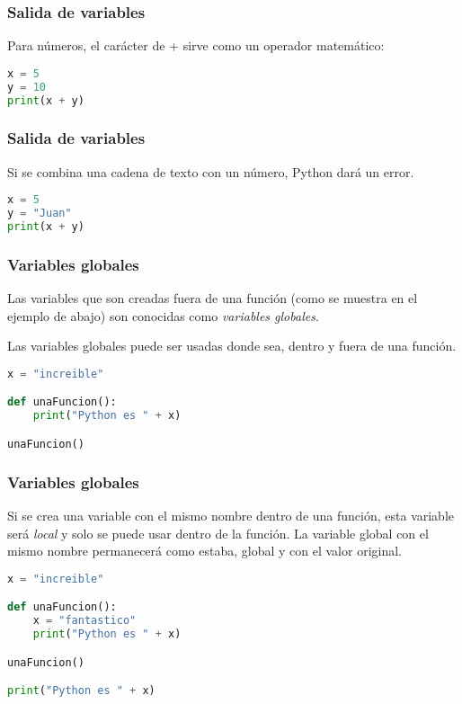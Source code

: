 \begin{frame}[fragile]
  \frametitle{Salida de variables}

  Para números, el carácter de \textcolor{codeKeyword}{+} sirve como un
  operador matemático:

  \vspace{\baselineskip}
  \begin{lstlisting}[language=Python]
x = 5
y = 10
print(x + y)
  \end{lstlisting}
\end{frame}

\begin{frame}[fragile]
  \frametitle{Salida de variables}

  \begin{alertblock}{}
    Si se combina una cadena de texto con un número, Python dará un error.
  \end{alertblock}

  \vspace{\baselineskip}
  \begin{lstlisting}[language=Python]
x = 5
y = "Juan"
print(x + y)
  \end{lstlisting}
\end{frame}

\begin{frame}[fragile]
  \frametitle{Variables globales}

  Las variables que son creadas fuera de una función (como se muestra en el
  ejemplo de abajo) son conocidas como \emph{variables globales}.

  \vspace{\baselineskip}
  Las variables globales puede ser usadas donde sea, dentro y fuera de una
  función.

  \vspace{\baselineskip}
  \begin{lstlisting}[language=Python]
x = "increible"

def unaFuncion():
    print("Python es " + x)

unaFuncion()
  \end{lstlisting}
\end{frame}

\begin{frame}[fragile]
  \frametitle{Variables globales}

  Si se crea una variable con el mismo nombre dentro de una función,
  esta variable será \emph{local} y solo se puede usar dentro de la función.
  La variable global con el mismo nombre permanecerá como estaba, global y
  con el valor original.

  \vspace{\baselineskip}
  \begin{lstlisting}[language=Python]
x = "increible"

def unaFuncion():
    x = "fantastico"
    print("Python es " + x)

unaFuncion()

print("Python es " + x)
  \end{lstlisting}
\end{frame}

